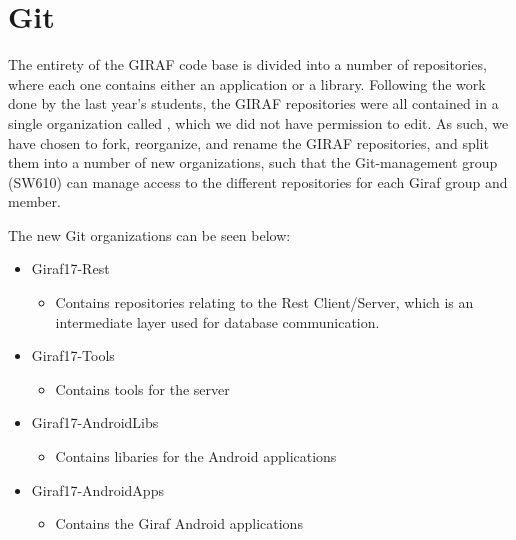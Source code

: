 \section{Git}\label{GitTool}
The entirety of the GIRAF code base is divided into a number of repositories,
where each one contains either an application or a library. Following the work
done by the last year's students, the GIRAF repositories  were all contained in
a single organization called , which we did not have permission to
edit. As such, we have chosen to fork, reorganize, and rename the GIRAF
repositories, and split them into a number of new organizations, such that the
Git-management group (SW610) can manage access to the different repositories
for each Giraf group and member.



The new Git organizations can be seen below:
\begin{itemize}
	\item Giraf17-Rest
	\begin{itemize}
  		\item Contains repositories relating to the Rest Client/Server, which is an
  		intermediate layer used for database communication.
	\end{itemize}
  	\item Giraf17-Tools
  	\begin{itemize}
  		\item Contains tools for the server
	\end{itemize}
  	\item Giraf17-AndroidLibs
  	\begin{itemize}
  		\item Contains libaries for the Android applications
	\end{itemize}
  	\item Giraf17-AndroidApps
  	\begin{itemize}
  		\item Contains the Giraf Android applications 
	\end{itemize}
\end{itemize}


